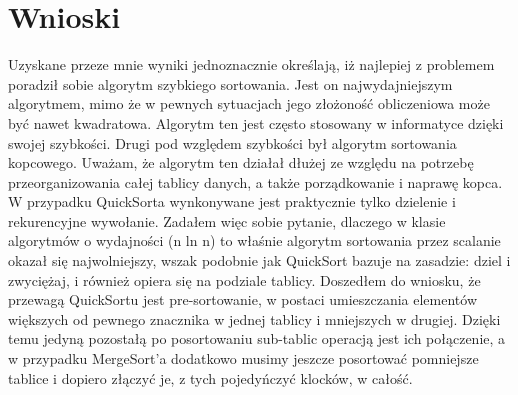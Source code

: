 \documentclass[a4paper,12pt]{article}
\begin{document}
\section{Wnioski}
Uzyskane przeze mnie wyniki jednoznacznie określają, iż najlepiej z problemem poradził sobie algorytm szybkiego sortowania. Jest on najwydajniejszym algorytmem, mimo
że w pewnych sytuacjach jego złożoność obliczeniowa może być nawet kwadratowa. Algorytm ten jest często stosowany w informatyce dzięki swojej szybkości. Drugi pod
względem szybkości był algorytm sortowania kopcowego. Uważam, że algorytm ten działał dłużej ze względu na potrzebę przeorganizowania całej tablicy danych, a także
porządkowanie i naprawę kopca. W przypadku QuickSorta wynkonywane jest praktycznie tylko dzielenie i rekurencyjne wywołanie. Zadałem więc sobie pytanie, dlaczego
w klasie algorytmów o wydajności (n ln n) to właśnie algorytm sortowania przez scalanie okazał się najwolniejszy, wszak podobnie jak QuickSort bazuje na zasadzie:
dziel i zwyciężaj, i również opiera się na podziale tablicy. Doszedłem do wniosku, że przewagą QuickSortu jest pre-sortowanie, w postaci umieszczania elementów
większych od pewnego znacznika w jednej tablicy i mniejszych w drugiej. Dzięki temu jedyną pozostałą po posortowaniu sub-tablic operacją jest ich połączenie, a w
przypadku MergeSort'a dodatkowo musimy jeszcze posortować pomniejsze tablice i dopiero złączyć je, z tych pojedyńczyć klocków, w całość.
\end{document}
